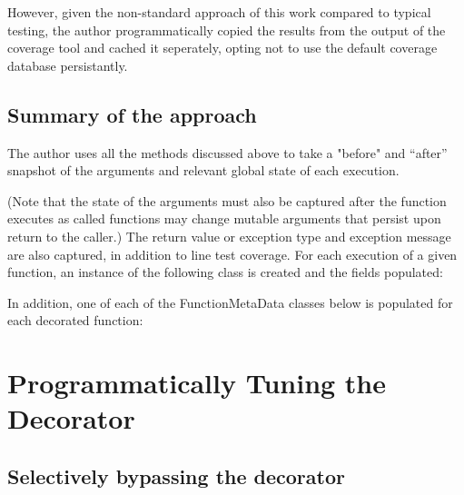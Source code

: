 

However, given the non-standard
approach of this work compared to typical testing, the author programmatically
copied the results from the output of the coverage tool and cached it seperately, 
opting not to use the default coverage database persistantly.

\subsection{Summary of the approach}\label{sec:approach-internal-5}

The author uses all the methods discussed above to take a "before" and “after” 
snapshot of the arguments and relevant global state of each execution. 

(Note that the state of the arguments must also be captured after the function 
executes as called functions may change mutable arguments that persist upon 
return to the caller.) The return value or exception type and exception message
 are also captured, in addition to line test coverage. 
 For each execution of a given function, an instance of the 
 following class is created and the fields populated:



In addition, one of each of the FunctionMetaData classes below is populated for each decorated function:



\section{Programmatically Tuning the Decorator}\label{sec:decorator tuning}

\subsection{Selectively bypassing the decorator}\label{sec:tuning-1}

